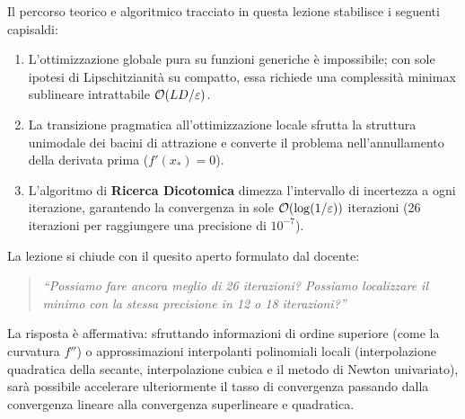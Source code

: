 Il percorso teorico e algoritmico tracciato in questa lezione stabilisce i seguenti capisaldi:
\begin{enumerate}
    \item L'ottimizzazione globale pura su funzioni generiche \`e impossibile; con sole ipotesi di Lipschitzianit\`a su compatto, essa richiede una complessit\`a minimax sublineare intrattabile $\mathcal{O}\!\left(LD/\varepsilon\right)$.
    \item La transizione pragmatica all'ottimizzazione locale sfrutta la struttura unimodale dei bacini di attrazione e converte il problema nell'annullamento della derivata prima ($f'(x_*) = 0$).
    \item L'algoritmo di \textbf{Ricerca Dicotomica} dimezza l'intervallo di incertezza a ogni iterazione, garantendo la convergenza in sole $\mathcal{O}\!\left(\log(1/\varepsilon)\right)$ iterazioni (26 iterazioni per raggiungere una precisione di $10^{-7}$).
\end{enumerate}

La lezione si chiude con il quesito aperto formulato dal docente:
\begin{quote}
\textit{``Possiamo fare ancora meglio di 26 iterazioni? Possiamo localizzare il minimo con la stessa precisione in 12 o 18 iterazioni?''}
\end{quote}
La risposta \`e affermativa: sfruttando informazioni di ordine superiore (come la curvatura $f''$) o approssimazioni interpolanti polinomiali locali (interpolazione quadratica della secante, interpolazione cubica e il metodo di Newton univariato), sar\`a possibile accelerare ulteriormente il tasso di convergenza passando dalla convergenza lineare alla convergenza superlineare e quadratica.
